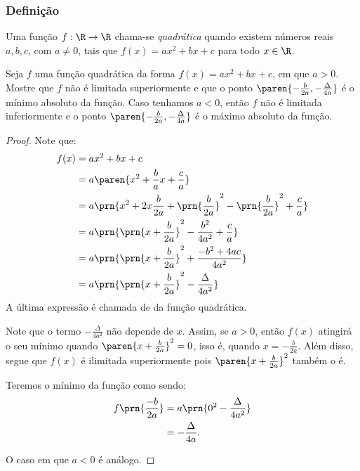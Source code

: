 \subsubsection{Definição}

\begin{definition}
Uma função $f: \R \to \R$ chama-se \emph{quadrática} quando existem
números reais $a, b, c$, com $a \neq 0$, tais que $f(x) = ax^2 +bx
+c$ para todo $x \in \R$.
\end{definition}

\begin{proposition}
Seja $f$ uma função quadrática da forma $f(x) = ax^2 + bx +c$, em que
$a >0$. Mostre que $f$ não é limitada superiormente e que o ponto
$\paren{-\frac {b} {2a}, -\frac {\Delta} {4a}}$ é o mínimo absoluto
da função. Caso tenhamos $a<0$, então $f$ não é limitada inferiormente e  o
ponto $\paren{-\frac {b} {2a}, -\frac {\Delta} {4a}}$ é o máximo
absoluto da função.
\end{proposition}

\begin{proof}
    Note que:
    \begin{align*}
        f(x) &= ax^2+bx+c\\
        &= a\paren{x^2 + \frac b a x + \frac c a} \\
        &= a\prn{x^2+2x\frac b {2a} + \prn{\frac b {2a}}^2  - \prn{\frac b {2a}}^2 + \frac c a} \\
        &= a\prn{\prn{x+\frac{b}{2a}}^2 - \frac{b^2}{4a^2}+\frac c a}\\
        &= a\prn{\prn{x+\frac{b}{2a}}^2 + \frac{-b^2+4ac}{4a^2}} \\
        &= a\prn{\prn{x+\frac{b}{2a}}^2 - \frac{\Delta}{4a^2}} \\
    \end{align*}
    \noindent A última expressão é chamada de  da função quadrática.

    Note que o termo $-\frac{\Delta}{4a^2}$ não depende de $x$. 
    Assim, se $a>0$, então $f(x)$ atingirá o seu mínimo quando $\paren{x+\frac b {2a}}^2=0$, isso é, quando
    $x = -\frac b {2a}$. 
    Além disso, segue que $f(x)$ é ilimitada superiormente pois $\paren{x+\frac{b}{2a}}^2$ também o é.

    Teremos o mínimo da função como sendo:
    \begin{align*}
        f\prn{\frac{-b}{2a}} &= a\prn{0^2-\frac{\Delta}{4a^2}} \\ &= -\frac{\Delta}{4a}.
    \end{align*}

    O caso em que $a<0$ é análogo.
\end{proof}

